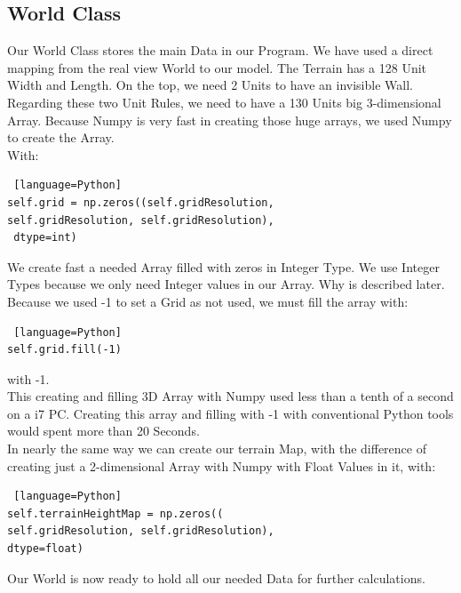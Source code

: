 \documentclass{sig-alternate-05-2015}
\begin{document}
\subsection{World Class}
Our World Class stores the main Data in our Program. We have used a direct mapping from the real view World to our model. The Terrain has a 128 Unit Width and Length. On the top, we need 2 Units to have an invisible Wall. Regarding these two Unit Rules, we need to have a 130 Units big 3-dimensional Array. Because Numpy is very fast in creating those huge arrays, we used Numpy to create the Array. \\
With:\\
\begin{lstlisting} [language=Python]
self.grid = np.zeros((self.gridResolution, 
self.gridResolution, self.gridResolution),
 dtype=int)
\end{lstlisting}
We create fast a needed Array filled with zeros in Integer Type. We use Integer Types because we only need Integer values in our Array. Why is described later. Because we used -1 to set a Grid as not used, we must fill the array with:\\
\begin{lstlisting} [language=Python]
self.grid.fill(-1)
\end{lstlisting}
with -1. \\
This creating and filling 3D Array with Numpy used less than a tenth of a second on a i7 PC. Creating this array and filling with -1 with conventional Python tools would spent more than 20 Seconds. \\
In nearly the same way we can create our terrain Map, with the difference of creating just a 2-dimensional Array with Numpy with Float Values in it, with: \\
\begin{lstlisting} [language=Python]
self.terrainHeightMap = np.zeros((
self.gridResolution, self.gridResolution), 
dtype=float)
\end{lstlisting}
Our World is now ready to hold all our needed Data for further calculations.\\
\end{document}
